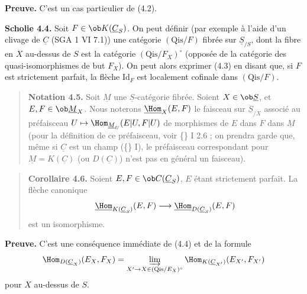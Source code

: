 \textbf{Preuve.} C'est un cas particulier de (4.2).

\textbf{Scholie 4.4.} Soit $F \in \ob K(\underline{C}_S)$. On peut définir (par exemple à l'aide d'un clivage de $\underline{C}$ (SGA 1 VI 7.1)) une catégorie $(\mathrm{Qis}/F)$ fibrée sur $\underline{S}_{/S}$, dont la fibre en $X$ au-dessus de $S$ est la catégorie $(\mathrm{Qis}/F_X)^\circ$ (opposée de la catégorie des quasi-isomorphismes de but $F_X$). On peut alors exprimer (4.3) en disant que, si $F$ est strictement parfait, la flèche $\mathrm{Id}_F$ est localement cofinale dans $(\mathrm{Qis}/F)$.

\begin{quote}
\textbf{Notation 4.5.} Soit $\underline{M}$ une $\underline{S}$-catégorie fibrée. Soient $X \in \ob \underline{S}$, et $E, F \in \ob \underline{M}_X$. Nous noterons $\underline{\Hom}_X(E, F)$ le faisceau sur $\underline{S}_{/X}$ associé au préfaisceau $U \mapsto \Hom_{\underline{M}_U}(E|U, F|U)$ de morphismes de $E$ dans $F$ dans $\underline{M}$ (pour la définition de ce préfaisceau, voir \{\} I 2.6 ; on prendra garde que, même si $\underline{C}$ est un champ (\{\} I), le préfaisceau correspondant pour $\underline{M} = K(\underline{C})$ (ou $D(\underline{C})$) n'est pas en général un faisceau).
\end{quote}

\begin{quote}
\textbf{Corollaire 4.6.} Soient $E, F \in \ob C(\underline{C}_S)$, $E$ étant strictement parfait. La flèche canonique
\[
\underline{\Hom}_{K(\underline{C}_S)}(E, F) \longrightarrow \underline{\Hom}_{D(\underline{C}_S)}(E, F)
\]
est un isomorphisme.
\end{quote}

\textbf{Preuve.} C'est une conséquence immédiate de (4.4) et de la formule
\[
\Hom_{D(\underline{C}_X)}(E_X, F_X) = \varinjlim_{X' \to X \in (\mathrm{Qis}/E_X)^\circ} \Hom_{K(\underline{C}_{X'})}(E_{X'}, F_{X'})
\]
pour $X$ au-dessus de $S$.

